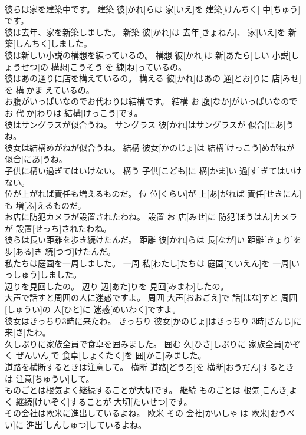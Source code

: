 \documentclass[8pt]{extreport}
\begin{document}
\begin{CJK}{UTF8}{min}
\\	彼らは家を建築中です。	建築	彼[かれ]らは 家[いえ]を 建築[けんちく] 中[ちゅう]です。	
\\	彼は去年、家を新築しました。	新築	彼[かれ]は 去年[きょねん]、 家[いえ]を 新築[しんちく]しました。	
\\	彼は新しい小説の構想を練っているの。	構想	彼[かれ]は 新[あたら]しい 小説[しょうせつ]の 構想[こうそう]を 練[ね]っているの。	
\\	彼はあの通りに店を構えているの。	構える	彼[かれ]はあの 通[とお]りに 店[みせ]を 構[かま]えているの。	
\\	お腹がいっぱいなのでお代わりは結構です。	結構	お 腹[なか]がいっぱいなのでお 代[か]わりは 結構[けっこう]です。	
\\	彼はサングラスが似合うね。	サングラス	彼[かれ]はサングラスが 似合[にあ]うね。	
\\	彼女は結構めがねが似合うね。	結構	彼女[かのじょ]は 結構[けっこう]めがねが 似合[にあ]うね。	
\\	子供に構い過ぎてはいけない。	構う	子供[こども]に 構[かま]い 過[す]ぎてはいけない。	
\\	位が上がれば責任も増えるものだ。	位	位[くらい]が 上[あ]がれば 責任[せきにん]も 増[ふ]えるものだ。	
\\	お店に防犯カメラが設置されたわね。	設置	お 店[みせ]に 防犯[ぼうはん]カメラが 設置[せっち]されたわね。	
\\	彼らは長い距離を歩き続けたんだ。	距離	彼[かれ]らは 長[なが]い 距離[きょり]を 歩[ある]き 続[つづ]けたんだ。	
\\	私たちは庭園を一周しました。	一周	私[わたし]たちは 庭園[ていえん]を 一周[いっしゅう]しました。	
\\	辺りを見回したの。	辺り	辺[あた]りを 見回[みまわ]したの。	
\\	大声で話すと周囲の人に迷惑ですよ。	周囲	大声[おおごえ]で 話[はな]すと 周囲[しゅうい]の 人[ひと]に 迷惑[めいわく]ですよ。	
\\	彼女はきっちり3時に来たわ。	きっちり	彼女[かのじょ]はきっちり 3時[さんじ]に 来[き]たわ。	
\\	久しぶりに家族全員で食卓を囲みました。	囲む	久[ひさ]しぶりに 家族全員[かぞく ぜんいん]で 食卓[しょくたく]を 囲[かこ]みました。	
\\	道路を横断するときは注意して。	横断	道路[どうろ]を 横断[おうだん]するときは 注意[ちゅうい]して。	
\\	ものごとは根気よく継続することが大切です。	継続	ものごとは 根気[こんき]よく 継続[けいぞく]することが 大切[たいせつ]です。	
\\	その会社は欧米に進出しているよね。	欧米	その 会社[かいしゃ]は 欧米[おうべい]に 進出[しんしゅつ]しているよね。	

\end{CJK}
\end{document}
